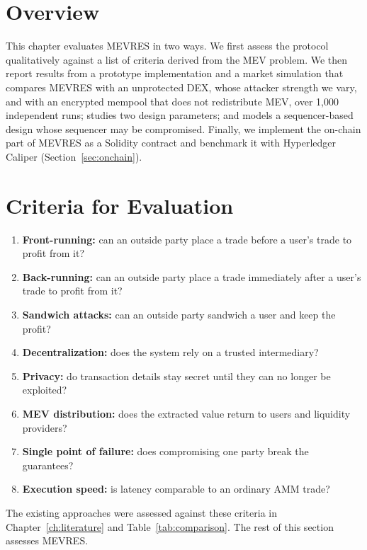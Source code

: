 \section{Overview}

This chapter evaluates MEVRES in two ways. We first assess the protocol qualitatively against a list of criteria derived from the MEV problem. We then report results from a prototype implementation and a market simulation that compares MEVRES with an unprotected DEX, whose attacker strength we vary, and with an encrypted mempool that does not redistribute MEV, over 1{,}000 independent runs; studies two design parameters; and models a sequencer-based design whose sequencer may be compromised. Finally, we implement the on-chain part of MEVRES as a Solidity contract and benchmark it with Hyperledger Caliper (Section~\ref{sec:onchain}).

\section{Criteria for Evaluation}

\begin{enumerate}
    \item \textbf{Front-running:} can an outside party place a trade before a user's trade to profit from it?
    \item \textbf{Back-running:} can an outside party place a trade immediately after a user's trade to profit from it?
    \item \textbf{Sandwich attacks:} can an outside party sandwich a user and keep the profit?
    \item \textbf{Decentralization:} does the system rely on a trusted intermediary?
    \item \textbf{Privacy:} do transaction details stay secret until they can no longer be exploited?
    \item \textbf{MEV distribution:} does the extracted value return to users and liquidity providers?
    \item \textbf{Single point of failure:} does compromising one party break the guarantees?
    \item \textbf{Execution speed:} is latency comparable to an ordinary AMM trade?
\end{enumerate}

The existing approaches were assessed against these criteria in Chapter~\ref{ch:literature} and Table~\ref{tab:comparison}. The rest of this section assesses MEVRES.

